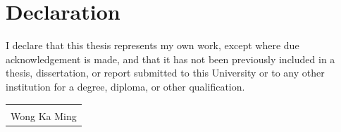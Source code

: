 \chapter*{Declaration}
\thispagestyle{plain}

I declare that this thesis represents my own work, except where due acknowledgement is made, and that it has not been previously included in a thesis, dissertation, or report submitted to this University or to any other institution for a degree, diploma, or other qualification.

\vspace{1in}

\noindent\begin{tabular}{@{}p{3.2in}@{}}
\\
\hrulefill\\
Wong Ka Ming
\end{tabular}

